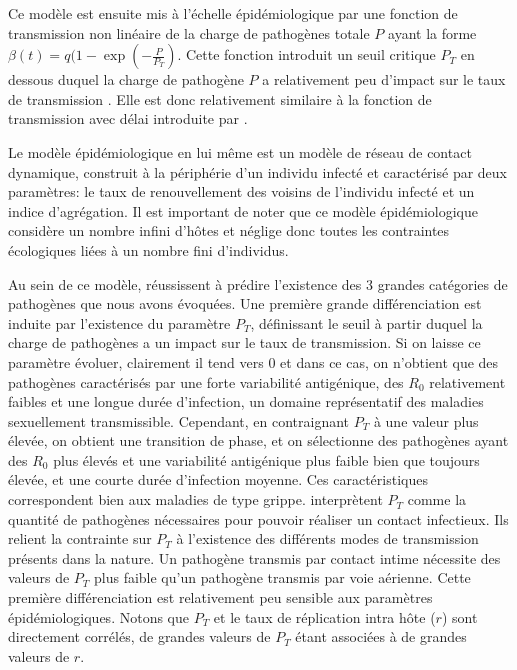 Ce modèle est ensuite mis à l'échelle épidémiologique par une fonction
de transmission non linéaire de la charge de pathogènes totale $P$
ayant la forme $\beta(t)=q(1-\exp(-\frac{P}{P_T})$. Cette fonction
introduit un seuil critique $P_T$ en dessous duquel la charge de
pathogène $P$ a relativement peu d'impact sur le taux de transmission
. Elle est donc relativement similaire à la fonction de transmission
avec délai introduite par \citet{King2009}.

Le modèle épidémiologique en lui même est un modèle de réseau de
contact dynamique, construit à la périphérie d'un individu infecté et
caractérisé par deux paramètres: le taux de renouvellement des voisins
de l'individu infecté et un indice d'agrégation. Il est important de
noter que ce modèle épidémiologique considère un nombre infini d'hôtes
et néglige donc toutes les contraintes écologiques liées à un nombre
fini d'individus.

Au sein de ce modèle, \citet{Lange2009} réussissent à prédire
l'existence des 3 grandes catégories de pathogènes que nous avons
évoquées. Une première grande différenciation est induite par
l'existence du paramètre $P_T$, définissant le seuil à partir duquel
la charge de pathogènes a un impact sur le taux de transmission. Si on
laisse ce paramètre évoluer, clairement il tend vers 0 et dans ce cas,
on n'obtient que des pathogènes caractérisés par une forte variabilité
antigénique, des $R_0$ relativement faibles et une longue durée
d'infection, un domaine représentatif des maladies sexuellement
transmissible. Cependant, en contraignant $P_T$ à une valeur plus
élevée, on obtient une transition de phase, et on sélectionne des
pathogènes ayant des $R_0$ plus élevés et une variabilité antigénique
plus faible bien que toujours élevée, et une courte durée d'infection
moyenne. Ces caractéristiques correspondent bien aux maladies de type
grippe. \citet{Lange2009} interprètent $P_T$ comme la quantité de
pathogènes nécessaires pour pouvoir réaliser un contact infectieux.
Ils relient la contrainte sur $P_T$ à l'existence des différents modes
de transmission présents dans la nature. Un pathogène transmis par
contact intime nécessite des valeurs de $P_T$ plus faible qu'un
pathogène transmis par voie aérienne. Cette première différenciation
est relativement peu sensible aux paramètres épidémiologiques. Notons
que $P_T$ et le taux de réplication intra hôte ($r$) sont directement
corrélés, de grandes valeurs de $P_T$ étant associées à de grandes
valeurs de $r$.

